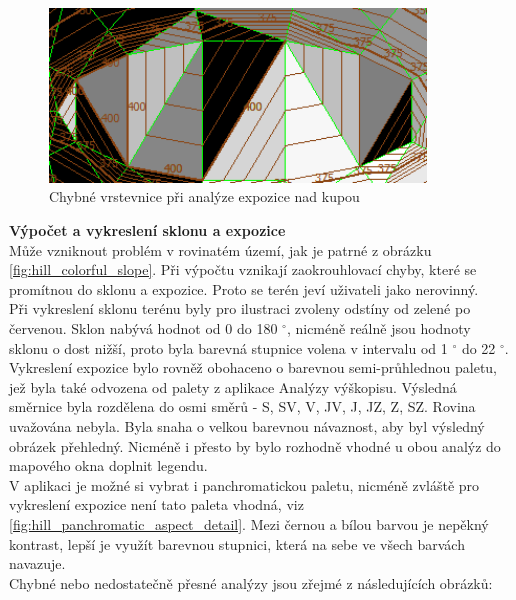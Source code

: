 \documentclass[a4paper,11pt,twoside]{article}
\begin{document}
\vspace{0.2cm}
\begin{figure}[hbt!] 
\begin{center}
\includegraphics[width=10cm]{pictures/hill_panchromatic_aspect_detail2.PNG} 
\caption[Chybné vrstevnice při analýze expozice nad kupou]{Chybné vrstevnice při analýze expozice nad kupou}
\label{fig:hill_panchromatic_aspect_detail2}
\end{center}
\end{figure}

\newpage
\noindent\textbf{Výpočet a vykreslení sklonu a expozice}\\
Může vzniknout problém v rovinatém území, jak je patrné z obrázku \ref{fig:hill_colorful_slope}. Při výpočtu vznikají zaokrouhlovací chyby, které se promítnou do sklonu a expozice. Proto se terén jeví uživateli jako nerovinný.\\
\indent Při vykreslení sklonu terénu byly pro ilustraci zvoleny odstíny od zelené po červenou. Sklon nabývá hodnot od 0 do 180 $^\circ$, nicméně reálně jsou hodnoty sklonu o dost nižší, proto byla barevná stupnice volena v intervalu od 1 $^\circ$ do 22 $^\circ$. \\
\indent Vykreslení expozice bylo rovněž obohaceno o barevnou semi-průhlednou paletu, jež byla také odvozena od palety z aplikace Analýzy výškopisu. Výsledná směrnice byla rozdělena do osmi směrů - S, SV, V, JV, J, JZ, Z, SZ. Rovina uvažována nebyla. Byla snaha o velkou barevnou návaznost, aby byl výsledný obrázek přehledný. Nicméně i přesto by bylo rozhodně vhodné u obou analýz do mapového okna doplnit legendu. \\ 
\indent V aplikaci je možné si vybrat i panchromatickou paletu, nicméně zvláště pro vykreslení expozice není tato paleta vhodná, viz \ref{fig:hill_panchromatic_aspect_detail}. Mezi černou a bílou barvou je nepěkný kontrast, lepší je využít barevnou stupnici, která na sebe ve všech barvách navazuje.\\
\indent Chybné nebo nedostatečně přesné analýzy jsou zřejmé z následujících obrázků:\\
\end{document}
